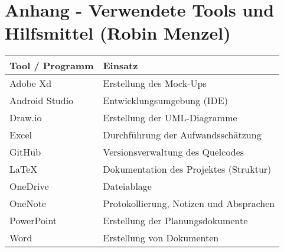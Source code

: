 \section{Anhang - Verwendete Tools und Hilfsmittel (Robin Menzel)}
\label{instal}

\begin{tabular}{|p{5cm}|p{9cm}|}
\hline
{\textbf{Tool / Programm}} & {\textbf{Einsatz}} \\ \hline
Adobe Xd & Erstellung des Mock-Ups\\ \hline
Android Studio & Entwicklungsumgebung (IDE) \\ \hline
Draw.io & Erstellung der UML-Diagramme \\ \hline
Excel & Durchführung der Aufwandsschätzung\\ \hline
GitHub & Versionsverwaltung des Quelcodes\\ \hline
LaTeX & Dokumentation des Projektes (Struktur)\\ \hline
OneDrive & Dateiablage \\ \hline
OneNote & Protokollierung, Notizen und Absprachen\\ \hline
PowerPoint & Erstellung der Planungsdokumente\\ \hline
Word & Erstellung von Dokumenten \\ \hline
\end{tabular}

